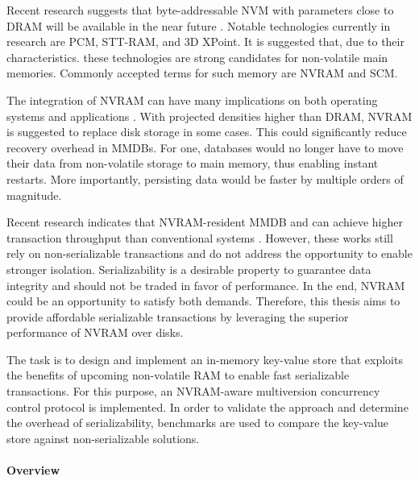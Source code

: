 Recent research suggests that byte-addressable \ac{NVM} with parameters close to
\ac{DRAM} will be available in the near future \cite{dulloor2014system,
oukid2017data, andrei2017sap}. Notable technologies currently in research are
\ac{PCM}, \ac{STT-RAM}, and 3D XPoint. It is suggested that, due to their
characteristics. these technologies are strong candidates for non-volatile main
memories. Commonly accepted terms for such memory are \ac{NVRAM} and \ac{SCM}.

The integration of \ac{NVRAM} can have many implications on both operating
systems and applications \cite{condit2009better, bailey2011operating,
pelley2013storage, boehm2016persistence}. With projected densities higher than
\ac{DRAM}, \ac{NVRAM} is suggested to replace disk storage in some cases. This
could significantly reduce recovery overhead in \acp{MMDB}. For one, databases
would no longer have to move their data from non-volatile storage to main
memory, thus enabling instant restarts. More importantly, persisting data would
be faster by multiple orders of magnitude.


Recent research indicates that NVRAM-resident \ac{MMDB} and \kvsp can achieve
higher transaction throughput than conventional systems
\cite{bailey2013exploring, zhou2016nvht}. However, these works still rely on
non-serializable transactions and do not address the opportunity to enable
stronger isolation. Serializability is a desirable property to guarantee data
integrity and should not be traded in favor of performance. In the end,
\ac{NVRAM} could be an opportunity to satisfy both demands. Therefore, this
thesis aims to provide affordable serializable transactions by leveraging the
superior performance of \ac{NVRAM} over disks.


The task is to design and implement an in-memory key-value store that exploits
the benefits of upcoming non-volatile \ac{RAM} to enable fast serializable
transactions. For this purpose, an \ac{NVRAM}-aware multiversion concurrency
control protocol is implemented. In order to validate the approach and determine
the overhead of serializability, benchmarks are used to compare the key-value
store against non-serializable solutions.


\paragraph{Overview}

